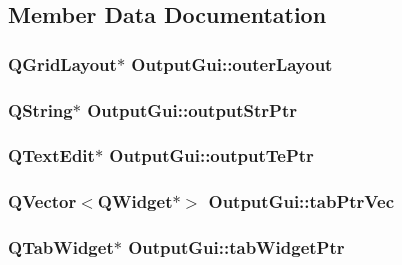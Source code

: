 \subsection{Member Data Documentation}
\hypertarget{class_output_gui_aa25ed1be530acc4508eaf042144b4458}{
\subsubsection[{outer\-Layout}]{\setlength{\rightskip}{0pt plus 5cm}Q\-Grid\-Layout$\ast$ Output\-Gui\-::outer\-Layout\hspace{0.3cm}{\ttfamily [private]}}}\label{class_output_gui_aa25ed1be530acc4508eaf042144b4458}
\hypertarget{class_output_gui_acea305d3550516efa01d04ac26e7cdfe}{
\subsubsection[{output\-Str\-Ptr}]{\setlength{\rightskip}{0pt plus 5cm}Q\-String$\ast$ Output\-Gui\-::output\-Str\-Ptr\hspace{0.3cm}{\ttfamily [private]}}}\label{class_output_gui_acea305d3550516efa01d04ac26e7cdfe}
\hypertarget{class_output_gui_affbe7d587f4f755b67cae654f5e468d8}{
\subsubsection[{output\-Te\-Ptr}]{\setlength{\rightskip}{0pt plus 5cm}Q\-Text\-Edit$\ast$ Output\-Gui\-::output\-Te\-Ptr\hspace{0.3cm}{\ttfamily [private]}}}\label{class_output_gui_affbe7d587f4f755b67cae654f5e468d8}
\hypertarget{class_output_gui_a669643ee3eabbe9b198bcb43f56ae053}{
\subsubsection[{tab\-Ptr\-Vec}]{\setlength{\rightskip}{0pt plus 5cm}Q\-Vector$<$Q\-Widget$\ast$$>$ Output\-Gui\-::tab\-Ptr\-Vec\hspace{0.3cm}{\ttfamily [private]}}}\label{class_output_gui_a669643ee3eabbe9b198bcb43f56ae053}
\hypertarget{class_output_gui_a2f8f77a6c77ee8bb00088be2de61c93b}{
\subsubsection[{tab\-Widget\-Ptr}]{\setlength{\rightskip}{0pt plus 5cm}Q\-Tab\-Widget$\ast$ Output\-Gui\-::tab\-Widget\-Ptr\hspace{0.3cm}{\ttfamily [private]}}}\label{class_output_gui_a2f8f77a6c77ee8bb00088be2de61c93b}


